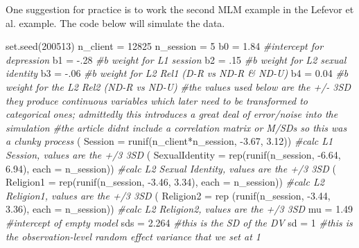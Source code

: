 \documentclass[
  english,
]{book}
\newenvironment{Shaded}{\begin{snugshade}}{\end{snugshade}}
\newcommand{\AttributeTok}[1]{\textcolor[rgb]{0.77,0.63,0.00}{#1}}
\newcommand{\CommentTok}[1]{\textcolor[rgb]{0.56,0.35,0.01}{\textit{#1}}}
\newcommand{\DecValTok}[1]{\textcolor[rgb]{0.00,0.00,0.81}{#1}}
\newcommand{\FloatTok}[1]{\textcolor[rgb]{0.00,0.00,0.81}{#1}}
\newcommand{\FunctionTok}[1]{\textcolor[rgb]{0.00,0.00,0.00}{#1}}
\newcommand{\NormalTok}[1]{#1}
\newcommand{\OtherTok}[1]{\textcolor[rgb]{0.56,0.35,0.01}{#1}}
\newcommand{\SpecialCharTok}[1]{\textcolor[rgb]{0.00,0.00,0.00}{#1}}
\begin{document}
One suggestion for practice is to work the second MLM example in the Lefevor et al. \citep{lefevor_religious_2017} example. The code below will simulate the data.

\begin{Shaded}
\begin{Highlighting}[]
\FunctionTok{set.seed}\NormalTok{(}\DecValTok{200513}\NormalTok{)}
\NormalTok{n\_client }\OtherTok{=} \DecValTok{12825}
\NormalTok{n\_session }\OtherTok{=} \DecValTok{5}
\NormalTok{b0 }\OtherTok{=} \FloatTok{1.84} \CommentTok{\#intercept for depression}
\NormalTok{b1 }\OtherTok{=} \SpecialCharTok{{-}}\NormalTok{.}\DecValTok{28} \CommentTok{\#b weight for L1 session}
\NormalTok{b2 }\OtherTok{=}\NormalTok{ .}\DecValTok{15} \CommentTok{\#b weight for L2 sexual identity}
\NormalTok{b3 }\OtherTok{=}  \SpecialCharTok{{-}}\NormalTok{.}\DecValTok{06} \CommentTok{\#b weight for L2 Rel1 (D{-}R vs ND{-}R \& ND{-}U)}
\NormalTok{b4 }\OtherTok{=} \FloatTok{0.04} \CommentTok{\#b weight for the L2 Rel2 (ND{-}R vs ND{-}U)}
\CommentTok{\#the values used below are the +/{-} 3SD they produce continuous variables which later need to be transformed to categorical ones; admittedly this introduces a great deal of error/noise into the simulation}
\CommentTok{\#the article didn\textquotesingle{}t include a correlation matrix or M/SDs so this was a clunky process }
\NormalTok{( }\AttributeTok{Session =} \FunctionTok{runif}\NormalTok{(n\_client}\SpecialCharTok{*}\NormalTok{n\_session, }\SpecialCharTok{{-}}\FloatTok{3.67}\NormalTok{, }\FloatTok{3.12}\NormalTok{)) }\CommentTok{\#calc L1 Session, values are the +/3 3SD}
\NormalTok{( }\AttributeTok{SexualIdentity =} \FunctionTok{rep}\NormalTok{(}\FunctionTok{runif}\NormalTok{(n\_session, }\SpecialCharTok{{-}}\FloatTok{6.64}\NormalTok{, }\FloatTok{6.94}\NormalTok{), }\AttributeTok{each =}\NormalTok{ n\_session)) }\CommentTok{\#calc L2 Sexual Identity, values are the +/3 3SD}
\NormalTok{( }\AttributeTok{Religion1 =} \FunctionTok{rep}\NormalTok{(}\FunctionTok{runif}\NormalTok{(n\_session, }\SpecialCharTok{{-}}\FloatTok{3.46}\NormalTok{, }\FloatTok{3.34}\NormalTok{), }\AttributeTok{each =}\NormalTok{ n\_session)) }\CommentTok{\#calc L2 Religion1, values are the +/3 3SD}
\NormalTok{( }\AttributeTok{Religion2 =} \FunctionTok{rep}\NormalTok{ (}\FunctionTok{runif}\NormalTok{(n\_session, }\SpecialCharTok{{-}}\FloatTok{3.44}\NormalTok{, }\FloatTok{3.36}\NormalTok{), }\AttributeTok{each =}\NormalTok{ n\_session)) }\CommentTok{\#calc L2 Religion2, values are the +/3 3SD}
\NormalTok{mu }\OtherTok{=} \FloatTok{1.49} \CommentTok{\#intercept of empty model }
\NormalTok{sds }\OtherTok{=} \FloatTok{2.264} \CommentTok{\#this is the SD of the DV}
\NormalTok{sd }\OtherTok{=} \DecValTok{1} \CommentTok{\#this is the observation{-}level random effect variance that we set at 1}


\end{Highlighting}
\end{Shaded}
\end{document}
